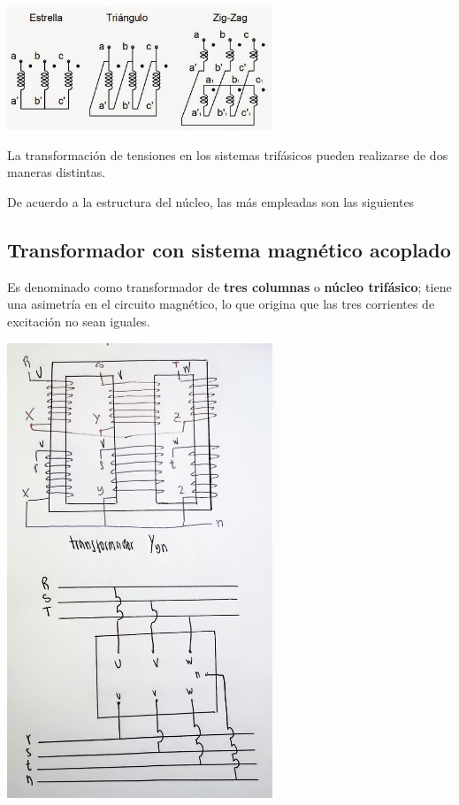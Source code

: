 \documentclass[11pt]{report}
\begin{document}
\begin{center}
  \includegraphics[width=300px]{conexiones-trafo.jpg}
\end{center}

La transformación de tensiones en los sistemas trifásicos
pueden realizarse de dos maneras distintas.

De acuerdo a la estructura del núcleo, las más empleadas son las siguientes

\subsection{Transformador con sistema magnético acoplado}
Es denominado como transformador de \textbf{tres columnas} o \textbf{núcleo
  trifásico};
tiene una asimetría en el circuito magnético, lo que origina que las tres
corrientes de excitación no sean iguales.

\begin{center}
  \includegraphics[width=300px]{trafo-trifasico.jpeg}
\end{center}
\end{document}
